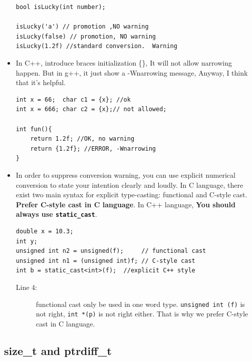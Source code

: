 \documentclass[a4paper,11pt,twoside]{book}
\begin{document}
\begin{itemize}
\begin{lstlisting}[numbers=none]
bool isLucky(int number);

isLucky('a') // promotion ,NO warning
isLucky(false) // promotion, NO warning
isLucky(1.2f) //standard conversion.  Warning
\end{lstlisting}
	
	\item In C++, introduce braces initialization \{\}, It will not allow narrowing happen. But in g++, it just show a -Wnarrowing message, Anyway, I think that it's helpful.
\begin{lstlisting}[numbers=none]
int x = 66;  char c1 = {x}; //ok	
int x = 666; char c2 = {x};// not allowed;

int fun(){
	return 1.2f; //OK, no warning
	return {1.2f}; //ERROR, -Wnarrowing
}
\end{lstlisting}
	
	\item In order to suppress conversion warning, you can use explicit numerical conversion to state your intention clearly and loudly. In C language, there exist two main syntax for explicit type-casting: functional and C-style cast.  \textbf{Prefer C-style cast in C language}. In C++ language, \textbf{You should always use \texttt{static\_cast}}.
	
\begin{lstlisting}[]
double x = 10.3;
int y;
unsigned int n2 = unsigned(f);     // functional cast
unsigned int n1 = (unsigned int)f; // C-style cast
int b = static_cast<int>(f);  //explicit C++ style
\end{lstlisting}
	\begin{description}
		\item[Line 4:] functional cast only be used in one word type. \texttt{unsigned int (f)} is not right, \texttt{int *(p)} is not right either. That is why we prefer C-style cast in C language.
	\end{description}
\end{itemize}

\subsection{size\_t and ptrdiff\_t}
\end{document}

